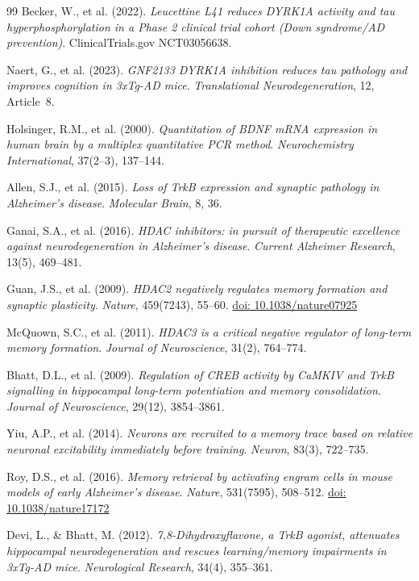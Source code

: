 \documentclass[12pt,a4paper]{article}
\begin{document}
\begin{thebibliography}{99}
Becker, W., et al. (2022).
\textit{Leucettine L41 reduces DYRK1A activity
and tau hyperphosphorylation in a Phase 2
clinical trial cohort (Down syndrome/AD prevention)}.
ClinicalTrials.gov NCT03056638.

Naert, G., et al. (2023).
\textit{GNF2133 DYRK1A inhibition reduces tau
pathology and improves cognition in 3xTg-AD mice}.
\textit{Translational Neurodegeneration}, 12, Article~8.

Holsinger, R.M., et al. (2000).
\textit{Quantitation of BDNF mRNA expression in
human brain by a multiplex quantitative PCR method}.
\textit{Neurochemistry International}, 37(2--3), 137--144.

Allen, S.J., et al. (2015).
\textit{Loss of TrkB expression and synaptic
pathology in Alzheimer's disease}.
\textit{Molecular Brain}, 8, 36.

Ganai, S.A., et al. (2016).
\textit{HDAC inhibitors: in pursuit of therapeutic
excellence against neurodegeneration in Alzheimer's
disease}.
\textit{Current Alzheimer Research}, 13(5), 469--481.

Guan, J.S., et al. (2009).
\textit{HDAC2 negatively regulates memory formation
and synaptic plasticity}.
\textit{Nature}, 459(7243), 55--60.
\href{https://doi.org/10.1038/nature07925}
{doi: 10.1038/nature07925}

McQuown, S.C., et al. (2011).
\textit{HDAC3 is a critical negative regulator of
long-term memory formation}.
\textit{Journal of Neuroscience}, 31(2), 764--774.

Bhatt, D.L., et al. (2009).
\textit{Regulation of CREB activity by CaMKIV
and TrkB signalling in hippocampal long-term
potentiation and memory consolidation}.
\textit{Journal of Neuroscience}, 29(12), 3854--3861.

Yiu, A.P., et al. (2014).
\textit{Neurons are recruited to a memory trace
based on relative neuronal excitability immediately
before training}.
\textit{Neuron}, 83(3), 722--735.

Roy, D.S., et al. (2016).
\textit{Memory retrieval by activating engram cells
in mouse models of early Alzheimer's disease}.
\textit{Nature}, 531(7595), 508--512.
\href{https://doi.org/10.1038/nature17172}
{doi: 10.1038/nature17172}

Devi, L., \& Bhatt, M. (2012).
\textit{7,8-Dihydroxyflavone, a TrkB agonist,
attenuates hippocampal neurodegeneration and
rescues learning/memory impairments in 3xTg-AD
mice}.
\textit{Neurological Research}, 34(4), 355--361.


\end{thebibliography}
\end{document}
